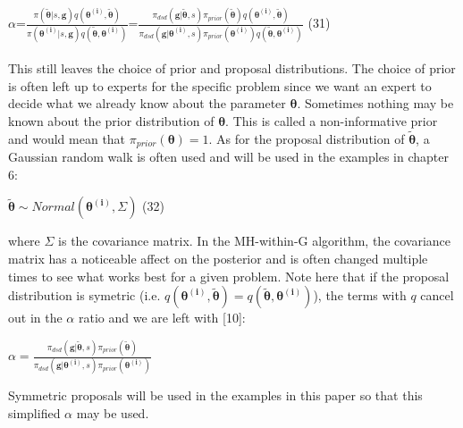 \documentclass[botnum, fleqn]{unmeethesis}
\begin{document}
\hspace{\fill}$\alpha$=\Large$\frac{\pi(\widetilde{\bm{\theta}}|s,\bm{g})q(\bm{\theta^{(i)}},\widetilde{\bm{\theta}})}{\pi(\bm{\theta^{(i)}} |s,\bm{g})q(\widetilde{\bm{\theta}},\bm{\theta^{(i)}})}$=$\frac{\pi_{dsd}(\bm{g}|\widetilde{\bm{\theta}},s)\pi_{prior}(\widetilde{\bm{\theta}})q(\bm{\theta^{(i)}},\widetilde{\bm{\theta}})} {\pi_{dsd}(\bm{g}|\bm{\theta^{(i)}},s)\pi_{prior}(\bm{\theta^{(i)}})q(\widetilde{\bm{\theta}},\bm{\theta^{(i)}})}$\hspace{\fill} \normalsize (31)
\\ \\
This still leaves the choice of prior and proposal distributions. The choice of prior is often left up to experts for the specific problem since we want an expert to decide what we already know about the parameter $\bm{\theta}$. Sometimes nothing may be known about the prior distribution of $\bm{\theta}$. This is called a non-informative prior and would mean that $\pi_{prior}(\bm{\theta})=1$. As for the proposal distribution of $\widetilde{\bm{\theta}}$, a Gaussian random walk is often used and will be used in the examples in chapter 6:

\hspace{\fill}$\widetilde{\bm{\theta}} \sim Normal(\bm{\theta^{(i)}},\Sigma)$\hspace{\fill} \normalsize (32)

where $\Sigma$ is the covariance matrix. In the MH-within-G algorithm, the covariance matrix has a noticeable affect on the posterior and is often changed multiple times to see what works best for a given problem. Note here that if the proposal distribution is symetric (i.e. $q(\bm{\theta^{(i)}},\widetilde{\bm{\theta}})=q(\widetilde{\bm{\theta}},\bm{\theta^{(i)}})$), the terms with $q$ cancel out in the $\alpha$ ratio and we are left with [10]:
\begin{center}
	$\alpha=$\Large$\frac{\pi_{dsd}(\bm{g}|\widetilde{\bm{\theta}},s)\pi_{prior}(\widetilde{\bm{\theta}})} {\pi_{dsd}(\bm{g}|\bm{\theta^{(i)}},s)\pi_{prior}(\bm{\theta^{(i)}})}$
\end{center}
Symmetric proposals will be used in the examples in this paper so that this simplified $\alpha$ may be used. 
\newpage
\end{document}
